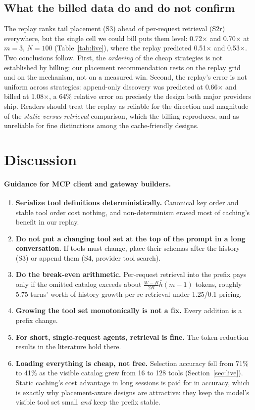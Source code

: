 \documentclass[11pt]{article}
\begin{document}
\subsection{What the billed data do and do not confirm}
\label{sec:reconcile}
The replay ranks tail placement (S3) ahead of per-request retrieval (S2r) everywhere, but the single cell we could bill puts them level: 0.72$\times$ and 0.70$\times$ at $m{=}3$, $N{=}100$ (Table~\ref{tab:live}), where the replay predicted 0.51$\times$ and 0.53$\times$. Two conclusions follow. First, the \emph{ordering} of the cheap strategies is not established by billing; our placement recommendation rests on the replay grid and on the mechanism, not on a measured win. Second, the replay's error is not uniform across strategies: append-only discovery was predicted at 0.66$\times$ and billed at 1.08$\times$, a 64\% relative error on precisely the design both major providers ship. Readers should treat the replay as reliable for the direction and magnitude of the \emph{static-versus-retrieval} comparison, which the billing reproduces, and as unreliable for fine distinctions among the cache-friendly designs.

\section{Discussion}
\label{sec:discussion}
\paragraph{Guidance for MCP client and gateway builders.}
\begin{enumerate}
\item \textbf{Serialize tool definitions deterministically.} Canonical key order and stable tool order cost nothing, and non-determinism erased most of caching's benefit in our replay.
\item \textbf{Do not put a changing tool set at the top of the prompt in a long conversation.} If tools must change, place their schemas after the history (S3) or append them (S4, provider tool search).
\item \textbf{Do the break-even arithmetic.} Per-request retrieval into the prefix pays only if the omitted catalog exceeds about $\frac{W-R}{2R}\bar h (m{-}1)$ tokens, roughly 5.75 turns' worth of history growth per re-retrieval under 1.25/0.1 pricing.
\item \textbf{Growing the tool set monotonically is not a fix.} Every addition is a prefix change.
\item \textbf{For short, single-request agents, retrieval is fine.} The token-reduction results in the literature hold there.
\item \textbf{Loading everything is cheap, not free.} Selection accuracy fell from 71\% to 41\% as the visible catalog grew from 16 to 128 tools (Section~\ref{sec:live}). Static caching's cost advantage in long sessions is paid for in accuracy, which is exactly why placement-aware designs are attractive: they keep the model's visible tool set small \emph{and} keep the prefix stable.
\end{enumerate}
\end{document}
